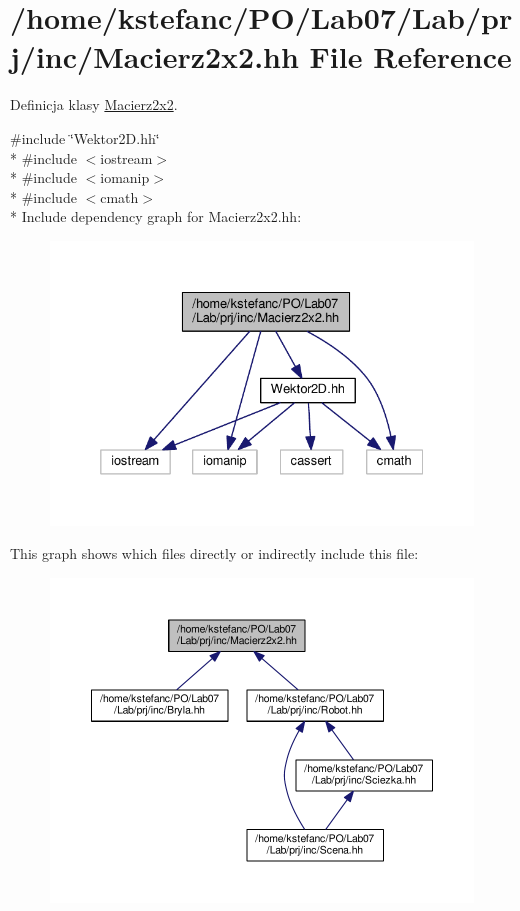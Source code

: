 \hypertarget{_macierz2x2_8hh}{\section{/home/kstefanc/\+P\+O/\+Lab07/\+Lab/prj/inc/\+Macierz2x2.hh File Reference}
\label{_macierz2x2_8hh}
}


Definicja klasy \hyperlink{class_macierz2x2}{Macierz2x2}.  


{\ttfamily \#include \char`\"{}Wektor2\+D.\+hh\char`\"{}}\\*
{\ttfamily \#include $<$iostream$>$}\\*
{\ttfamily \#include $<$iomanip$>$}\\*
{\ttfamily \#include $<$cmath$>$}\\*
Include dependency graph for Macierz2x2.\+hh\+:\nopagebreak
\begin{figure}[H]
\begin{center}
\leavevmode
\includegraphics[width=332pt]{_macierz2x2_8hh__incl}
\end{center}
\end{figure}
This graph shows which files directly or indirectly include this file\+:\nopagebreak
\begin{figure}[H]
\begin{center}
\leavevmode
\includegraphics[width=350pt]{_macierz2x2_8hh__dep__incl}
\end{center}
\end{figure}
